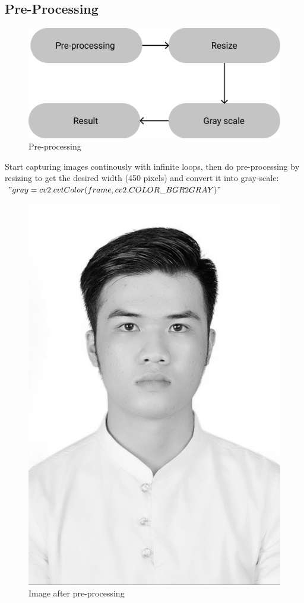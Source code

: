     \subsection{Pre-Processing}
        \begin{figure}[H]
            \centering
            \includegraphics[width=0.6\linewidth]{img/pre-processing.png}
            \caption{Pre-processing}
        \end{figure}
        Start capturing images continously with infinite loops, then do pre-processing by resizing to get the desired width (450 pixels) and 
        convert it into gray-scale: $"gray=cv2.cvtColor(frame, cv2.COLOR\_BGR2GRAY)"$
        \begin{figure}[H]
            \centering
            \includegraphics[width=0.6\linewidth]{img/Grayscale.png}
            \caption{Image after pre-processing}
        \end{figure}

